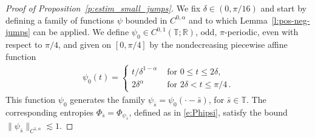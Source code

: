 \documentclass[fleqn
]{article}
\numberwithin{equation}{section}
\newcommand{\R}{{\mathbb R}}
\newcommand{\T}{{\mathbb T}}
\theoremstyle{definition}
\begin{document}
\begin{proof}[Proof of Proposition~\ref{p:estim_small_jumps}]
We fix $\delta\in (0,\pi/16)$ and start by defining a family of functions $\psi$ bounded in $C^{0,\alpha}$ and to which Lemma~\ref{l:pos-neg-jumps} can be applied.
We define $\psi_0\in C^{0,1}(\T;\R)$, odd, $\pi$-periodic, even with respect to $\pi/4$, and given on $[0,\pi/4]$ by the nondecreasing piecewise affine function
\begin{align*}
\psi_0(t)=\begin{cases}
t/\delta^{1-\alpha}
 &\text{ for }0\leq t\leq 2\delta,
\\
2\delta^{\alpha} & \text{ for }2\delta < t\leq \pi/4\,.
\end{cases}
\end{align*}
This function $\psi_0$ generates the family $\psi_{\bar s}=\psi_0(\cdot -\bar s)$, for $\bar s\in\T$.
The corresponding entropies $\Phi_{\bar s}=\Phi_{\psi_{\bar s}}$, defined as in \eqref{e:Phipsi}, satisfy the bound
$\|\psi_{\bar s}\|_{C^{1,\alpha}}\lesssim 1$. 


\end{proof}
\end{document}
